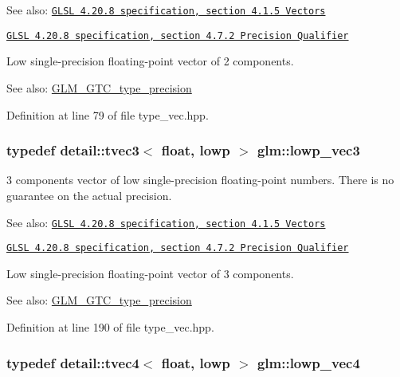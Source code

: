 \begin{Desc}
\item[See also:]\href{http://www.opengl.org/registry/doc/GLSLangSpec.4.20.8.pdf}{\tt GLSL 4.20.8 specification, section 4.1.5 Vectors} 

\href{http://www.opengl.org/registry/doc/GLSLangSpec.4.20.8.pdf}{\tt GLSL 4.20.8 specification, section 4.7.2 Precision Qualifier}\end{Desc}
Low single-precision floating-point vector of 2 components. \begin{Desc}
\item[See also:]\hyperlink{group__gtc__type__precision}{GLM\_\-GTC\_\-type\_\-precision} \end{Desc}


Definition at line 79 of file type\_\-vec.hpp.\hypertarget{group__core__precision_g062795097526e2758d34cb38387dd82d}{
\subsubsection[lowp\_\-vec3]{\setlength{\rightskip}{0pt plus 5cm}typedef detail::tvec3$<$ float, lowp $>$ {\bf glm::lowp\_\-vec3}}}
\label{group__core__precision_g062795097526e2758d34cb38387dd82d}


3 components vector of low single-precision floating-point numbers. There is no guarantee on the actual precision.

\begin{Desc}
\item[See also:]\href{http://www.opengl.org/registry/doc/GLSLangSpec.4.20.8.pdf}{\tt GLSL 4.20.8 specification, section 4.1.5 Vectors} 

\href{http://www.opengl.org/registry/doc/GLSLangSpec.4.20.8.pdf}{\tt GLSL 4.20.8 specification, section 4.7.2 Precision Qualifier}\end{Desc}
Low single-precision floating-point vector of 3 components. \begin{Desc}
\item[See also:]\hyperlink{group__gtc__type__precision}{GLM\_\-GTC\_\-type\_\-precision} \end{Desc}


Definition at line 190 of file type\_\-vec.hpp.\hypertarget{group__core__precision_g706ad1296c1cdcbd26c815fbb0f3f846}{
\subsubsection[lowp\_\-vec4]{\setlength{\rightskip}{0pt plus 5cm}typedef detail::tvec4$<$ float, lowp $>$ {\bf glm::lowp\_\-vec4}}}
\label{group__core__precision_g706ad1296c1cdcbd26c815fbb0f3f846}


